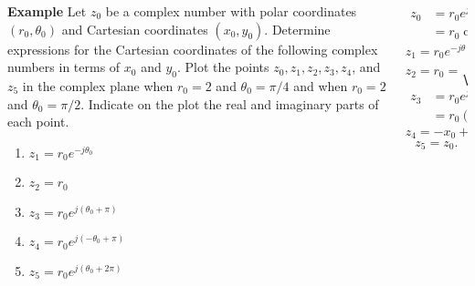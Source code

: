 \begin{frame}
    \begin{columns}[T]
        \begin{column}{0.5\textwidth}
            {\bf Example} Let $z_0$ be a complex number with polar coordinates $(r_0, \theta_0)$ and Cartesian coordinates $(x_0, y_0)$. Determine expressions for the Cartesian coordinates of the following complex numbers in terms of $x_0$ and $y_0$. Plot the points $z_0, z_1, z_2, z_3, z_4$, and $z_5$ in the complex plane when $r_0 = 2$ and $\theta_0 = \pi/4$ and when $r_0 = 2$ and $\theta_0 = \pi/2$. Indicate on the plot the real and imaginary parts of each point.
            \begin{enumerate}[<alert@+>]
                \item $z_1 = r_0e^{-j\theta_0}$
                \item $z_2 = r_0$
                \item $z_3 = r_0e^{j(\theta_0 + \pi)}$
                \item $z_4 = r_0e^{j(-\theta_0 + \pi)}$
                \item $z_5 = r_0e^{j(\theta_0 + 2\pi)}$
            \end{enumerate}

        \end{column}
            \begin{column}{0.5\textwidth}
            \begin{align*}
                z_0 &= r_0e^{j\theta_0} = r_0(\cos\theta_0 + j\sin\theta_0)\\ &= r_0\cos\theta_0 + jr_0\sin\theta_0 = x_0 + jy_0.
            \end{align*}
            \begin{equation*}
                z_1 = r_0e^{-j\theta} = r_0(\cos(-\theta_0) + j\sin(-\theta_0)) = x_0 - jy_0.
            \end{equation*}
            \begin{equation*}
                z_2 = r_0 = \sqrt{x_0^2+y_0^2}
            \end{equation*}
            \begin{align*}
                z_3 &= r_0e^{j(\theta_0 + \pi)}\\&= r_0(\cos(\theta_0 + \pi) + \sin(\theta_0 + \pi)) = -x_0 - jy_0 = -z_0.
            \end{align*}
            \begin{equation*}
                z_4 = -x_0 + jy_0.
            \end{equation*}
            \begin{equation*}
                z_5 = z_0.
            \end{equation*}
        \end{column}
    \end{columns}
\end{frame}


